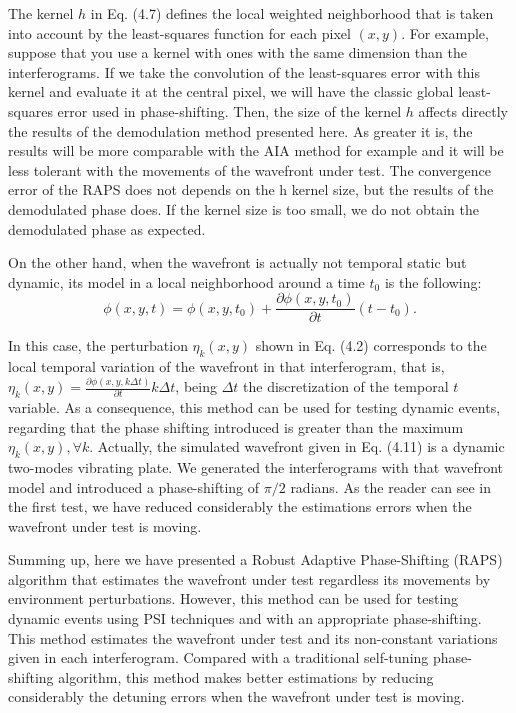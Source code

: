 The kernel $h$ in Eq. (4.7) defines the local weighted neighborhood that is
taken into account by the least-squares function for each pixel $(x,y)$. For
example, suppose that you use a kernel with ones with the same dimension than
the interferograms. If we take the convolution of the least-squares error with
this kernel and evaluate it at the central pixel, we will have the classic
global least-squares error used in phase-shifting. Then, the size of the kernel
$h$ affects directly the results of the demodulation method presented here. As
greater it is, the results will be more comparable with the AIA method for
example and it will be less tolerant with the movements of the wavefront under
test. The convergence error of the RAPS does not depends on the h kernel
size, but the results of the demodulated phase does. If the kernel size is too
small, we do not obtain the demodulated phase as expected.

On the other hand, when the wavefront is actually not temporal static but
dynamic, its model in a local neighborhood around a time $t_0$ is the following:
\begin{equation}
 \phi(x,y,t)= \phi(x,y,t_0) + \frac{\partial \phi(x,y,t_0) }{\partial t}
 (t-t_0).
\end{equation}

In this case, the perturbation $\eta_k(x,y)$ shown in Eq. (4.2) corresponds to
the local temporal variation of the wavefront in that interferogram, that is,
$\eta_k (x,y)= \frac{\partial \phi(x,y,k\Delta t)}{\partial t} k \Delta t$,
being $\Delta t$ the discretization of the temporal $t$ variable. As a
consequence, this method can be used for testing dynamic events, regarding that
the phase shifting introduced is greater than the maximum $\eta_k(x,y),\forall
k$. Actually, the simulated wavefront given in Eq. (4.11) is a dynamic
two-modes vibrating plate. We generated the interferograms with that wavefront
model and introduced a phase-shifting of $\pi/2$ radians. As the reader can
see in the first test, we have reduced considerably the estimations errors when
the wavefront under test is moving.

Summing up, here we have presented a Robust Adaptive Phase-Shifting (RAPS)
algorithm that estimates the wavefront under test regardless its movements by
environment perturbations. However, this method can be used for testing dynamic
events using PSI techniques and with an appropriate phase-shifting. This method
estimates the wavefront under test and its non-constant variations given in each
interferogram. Compared with a traditional self-tuning phase-shifting algorithm,
this method makes better estimations by reducing considerably the detuning
errors when the wavefront under test is moving.
